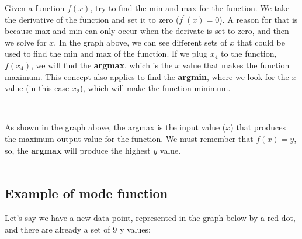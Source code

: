 Given a function $f(x)$, try to find the min and max for the function.
We take the derivative of the function and set it to zero ($f^{\prime}(x) = 0$).
A reason for that is because max and min can only occur when the derivate is set to zero, and
then we solve for $x$. In the graph above, we can see different sets of $x$ that could 
be used to find the min and max of the function. If we plug $x_4$ to the function, $f(x_4)$,
we will find the \textbf{argmax}, which is the $x$ value that makes the function maximum. This concept
also applies to find the \textbf{argmin}, where we look for the $x$ value (in this case $x_2$), which will make
the function minimum.\\


\begin{center}
     \\
\end{center}

As shown in the graph above, the argmax is the input value ($x$) that produces the maximum
output value for the function. We must remember that $f(x) = y$, so, the \textbf{argmax}
will produce the highest $y$ value.\\\\


\subsection{Example of mode function}

Let's say we have a new data point, represented in the graph below by a red dot, and there
are already a set of 9 y values:

